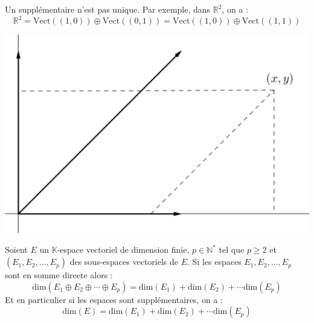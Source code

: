 \documentclass[a4paper,10pt]{report}
\begin{document}
\medskip

\begin{att} Un supplémentaire n'est pas unique. Par exemple, dans $\mathbb{R}^2$, on a :
$$ \mathbb{R}^2 = \textrm{Vect}((1,0)) \oplus \textrm{Vect}((0,1)) = \textrm{Vect}((1,0)) \oplus \textrm{Vect}((1,1))$$

\medskip


\begin{center}
\includegraphics[scale=0.3]{Supp}
\end{center}
\end{att}

\begin{prop} 
Soient $E$ un $\mathbb{K}$-espace vectoriel de dimension finie, $p \in \mathbb{N}^*$ tel que $p \geq 2$ et $(E_1, E_2, \ldots, E_p)$ des sous-espaces vectoriels de $E$. Si les espaces $E_1, E_2, \ldots, E_p$ sont en somme directe alors :
$$ \textrm{dim}(E_1 \oplus E_2 \oplus \cdots \oplus E_p) =\textrm{dim}(E_1) + \textrm{dim}(E_2) + \cdots \textrm{dim}(E_p)$$
Et en particulier si les espaces sont supplémentaires, on a :
$$ \textrm{dim}(E) = \textrm{dim}(E_1) + \textrm{dim}(E_2) + \cdots \textrm{dim}(E_p)$$
\end{prop}

\begin{preuve} 

\vspace{6cm}
\end{preuve}
\end{document}

